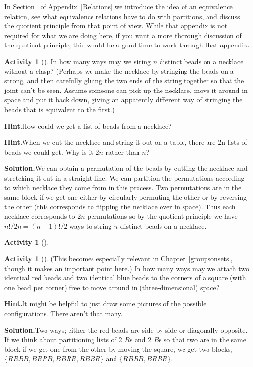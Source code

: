 \documentclass[10pt,]{book}
\theoremstyle{plain}
\theoremstyle{definition}
\newtheorem{activity}[project]{Activity}
\numberwithin{equation}{chapter}
\begin{document}
\par
In \hyperref[equivalencerelations]{Section~} of \hyperref[Relations]{Appendix~\ref{Relations}} we introduce the idea of an equivalence relation, see what equivalence relations have to do with partitions, and discuss the quotient principle from that point of view. While that appendix is not required for what we are doing here, if you want a more thorough discussion of the quotient principle, this would be a good time to work through that appendix.%
\begin{activity}[]\label{necklace}
In how many ways may we string \(n\) distinct beads on a necklace without a clasp? (Perhaps we make the necklace by stringing the beads on a strong, and then carefully gluing the two ends of the string together so that the joint can't be seen. Assume someone can pick up the necklace, move it around in space and put it back down, giving an apparently different way of stringing the beads that is equivalent to the first.)%
\par\medskip\noindent%
\textbf{Hint.}\quad How could we get a list of beads from a necklace?\par\medskip\noindent%
\textbf{Hint.}\quad When we cut the necklace and string it out on a table, there are 2n lists of beads we could get. Why is it \(2n\) rather than \(n\)?\par\medskip\noindent%
\textbf{Solution.}\quad We can obtain a permutation of the beads by cutting the necklace and stretching it out in a straight line. We can partition the permutations according to which necklace they come from in this process. Two permutations are in the same block if we get one either by circularly permuting the other or by reversing the other (this corresponds to flipping the necklace over in space). Thus each necklace corresponds to \(2n\) permutations so by the quotient principle we have \(n!/2n=(n-1)!/2\) ways to string \(n\) distinct beads on a necklace.%
\end{activity}
\begin{activity}[]\label{tennispairings2}
\end{activity}
\begin{activity}[]\label{twocolorsofbeads}
(This becomes especially relevant in \hyperref[groupsonsets]{Chapter~\ref{groupsonsets}}, though it makes an important point here.) In how many ways may we attach two identical red beads and two identical blue beads to the corners of a square (with one bead per corner) free to move around in (three-dimensional) space?%
\par\medskip\noindent%
\textbf{Hint.}\quad It might be helpful to just draw some pictures of the possible configurations. There aren’t that many.\par\medskip\noindent%
\textbf{Solution.}\quad Two ways; either the red beads are side-by-side or diagonally opposite. If we think about partitioning lists of 2 \(R\)s and 2 \(B\)s so that two are in the same block if we get one from the other by moving the square, we get two blocks, \(\{RRBB, BRRB, BBRR, RBBR\}\) and \(\{RBRB, BRBR\}\).%
\end{activity}
\end{document}
